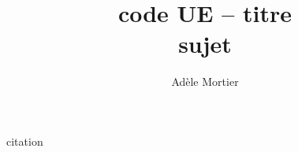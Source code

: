 \documentclass[a4paper,10pt]{article}
\title{code UE -- titre\\
	 sujet}
\author{Adèle Mortier}
\begin{document}
\cite{Brodsky1982}
\maketitle
\nocite{*}


\begin{center}
	\footnotesize
	\begin{minipage}{0.7\textwidth}
		citation
	\end{minipage}
\end{center}
\medskip



\end{document}

